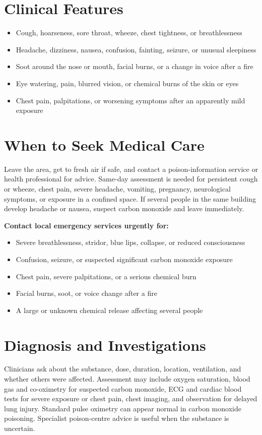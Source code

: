 \section*{Clinical Features}
\begin{itemize}
    \item Cough, hoarseness, sore throat, wheeze, chest tightness, or breathlessness
    \item Headache, dizziness, nausea, confusion, fainting, seizure, or unusual sleepiness
    \item Soot around the nose or mouth, facial burns, or a change in voice after a fire
    \item Eye watering, pain, blurred vision, or chemical burns of the skin or eyes
    \item Chest pain, palpitations, or worsening symptoms after an apparently mild exposure
\end{itemize}

\section*{When to Seek Medical Care}
Leave the area, get to fresh air if safe, and contact a poison-information service or health professional for advice. Same-day assessment is needed for persistent cough or wheeze, chest pain, severe headache, vomiting, pregnancy, neurological symptoms, or exposure in a confined space. If several people in the same building develop headache or nausea, suspect carbon monoxide and leave immediately.

\textbf{Contact local emergency services urgently for:}
\begin{itemize}
    \item Severe breathlessness, stridor, blue lips, collapse, or reduced consciousness
    \item Confusion, seizure, or suspected significant carbon monoxide exposure
    \item Chest pain, severe palpitations, or a serious chemical burn
    \item Facial burns, soot, or voice change after a fire
    \item A large or unknown chemical release affecting several people
\end{itemize}

\section*{Diagnosis and Investigations}
Clinicians ask about the substance, dose, duration, location, ventilation, and whether others were affected. Assessment may include oxygen saturation, blood gas and co-oximetry for suspected carbon monoxide, ECG and cardiac blood tests for severe exposure or chest pain, chest imaging, and observation for delayed lung injury. Standard pulse oximetry can appear normal in carbon monoxide poisoning. Specialist poison-centre advice is useful when the substance is uncertain.

